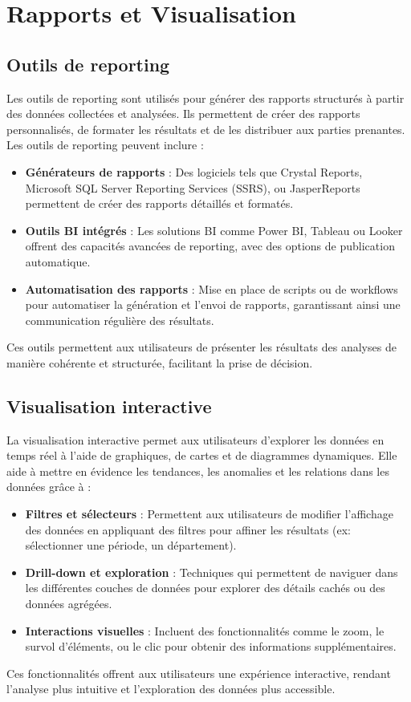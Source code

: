 \documentclass[a4paper,12pt]{report}
\begin{document}
\chapter{Rapports et Visualisation}

\section{Outils de reporting}
Les outils de reporting sont utilisés pour générer des rapports structurés à partir des données collectées et analysées. Ils permettent de créer des rapports personnalisés, de formater les résultats et de les distribuer aux parties prenantes. Les outils de reporting peuvent inclure :
\begin{itemize}
    \item \textbf{Générateurs de rapports} : Des logiciels tels que Crystal Reports, Microsoft SQL Server Reporting Services (SSRS), ou JasperReports permettent de créer des rapports détaillés et formatés.
    \item \textbf{Outils BI intégrés} : Les solutions BI comme Power BI, Tableau ou Looker offrent des capacités avancées de reporting, avec des options de publication automatique.
    \item \textbf{Automatisation des rapports} : Mise en place de scripts ou de workflows pour automatiser la génération et l'envoi de rapports, garantissant ainsi une communication régulière des résultats.
\end{itemize}
Ces outils permettent aux utilisateurs de présenter les résultats des analyses de manière cohérente et structurée, facilitant la prise de décision.

\section{Visualisation interactive}
La visualisation interactive permet aux utilisateurs d'explorer les données en temps réel à l'aide de graphiques, de cartes et de diagrammes dynamiques. Elle aide à mettre en évidence les tendances, les anomalies et les relations dans les données grâce à :
\begin{itemize}
    \item \textbf{Filtres et sélecteurs} : Permettent aux utilisateurs de modifier l'affichage des données en appliquant des filtres pour affiner les résultats (ex: sélectionner une période, un département).
    \item \textbf{Drill-down et exploration} : Techniques qui permettent de naviguer dans les différentes couches de données pour explorer des détails cachés ou des données agrégées.
    \item \textbf{Interactions visuelles} : Incluent des fonctionnalités comme le zoom, le survol d'éléments, ou le clic pour obtenir des informations supplémentaires.
\end{itemize}
Ces fonctionnalités offrent aux utilisateurs une expérience interactive, rendant l'analyse plus intuitive et l'exploration des données plus accessible.
\end{document}

